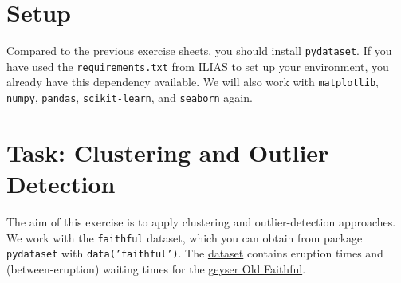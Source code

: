 \documentclass[12pt]{article}
\newcommand{\code}[1]{\textcolor{kitgreen}{\texttt{#1}}}
\begin{document}
\section*{Setup}

Compared to the previous exercise sheets, you should install \code{pydataset}.
If you have used the \code{requirements.txt} from ILIAS to set up your environment, you already have this dependency available.
We will also work with \code{matplotlib}, \code{numpy}, \code{pandas}, \code{scikit-learn}, and \code{seaborn} again.

\section*{Task: Clustering and Outlier Detection}

The aim of this exercise is to apply clustering and outlier-detection approaches.
We work with the \code{faithful} dataset, which you can obtain from package \code{pydataset} with \code{data('faithful')}.
The \href{https://www.rdocumentation.org/packages/datasets/versions/3.6.2/topics/faithful}{dataset} contains eruption times and (between-eruption) waiting times for the \href{https://en.wikipedia.org/wiki/Old_Faithful}{geyser Old Faithful}.
\end{document}
